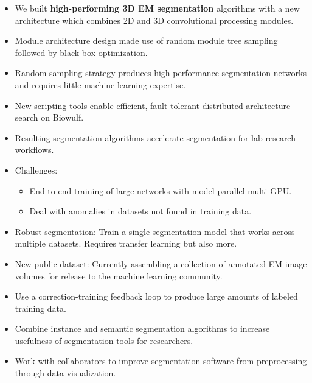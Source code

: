 \documentclass[final]{beamer}
\newlength{\onecolwid}
\renewcommand{\emph}[1]{{\color{nibib2} #1}}
\begin{document}
\begin{frame}[t]
\begin{columns}[t]
\begin{column}{\onecolwid}
\begin{tcolorbox}[title=Conclusion]
\begin{itemize}
\item We built \textbf{high-performing 3D EM segmentation} algorithms with a new architecture which combines 2D and 3D convolutional processing modules.
\item Module architecture design made use of \emph{random module tree} sampling followed by \emph{black box} optimization.
\item Random sampling strategy produces high-performance segmentation networks and requires little machine learning expertise.
\item New scripting tools enable efficient, fault-tolerant distributed architecture search on Biowulf.
\item Resulting segmentation algorithms \emph{accelerate segmentation} for lab research workflows.
\item Challenges:
\begin{itemize}
\item \emph{End-to-end} training of large networks with model-parallel multi-GPU.
\item Deal with \emph{anomalies} in datasets not found in training data.
\end{itemize}
\end{itemize}
\end{tcolorbox}

\begin{tcolorbox}[title=Future Work]
\begin{itemize}
\item \emph{Robust segmentation}: Train a single segmentation model that works across multiple datasets. Requires transfer learning but also more.
\item \emph{New public dataset}: Currently assembling a collection of annotated EM image volumes for release to the machine learning community.
\item Use a \emph{correction-training feedback loop} to produce large amounts of labeled training data.
\item Combine \emph{instance and semantic} segmentation algorithms to increase usefulness of segmentation tools for researchers.
\item Work with collaborators to \emph{improve segmentation software} from preprocessing through data visualization.
\end{itemize}

\end{tcolorbox}


\end{column}
\end{columns}
\end{frame}
\end{document}
